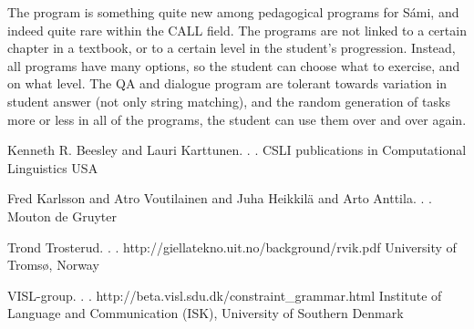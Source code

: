 \documentclass[11pt]{article}
\begin{document}
The program is something quite new among pedagogical programs for Sámi, and indeed quite rare within the CALL field. The programs are not linked to a certain chapter in a textbook, or to a certain level in the student's progression. Instead, all programs have many options, so the student can choose what to exercise, and on what level. The QA and dialogue program are tolerant towards variation in student answer (not only string matching), and the random generation of tasks more or less in all of the programs, the student can use them over and over again. 



\begin{thebibliography}{}

{Kenneth R. Beesley and Lauri Karttunen}.
.
.
\newblock CSLI publications in Computational Linguistics
\newblock USA


{Fred Karlsson and Atro Voutilainen and Juha Heikkilä and Arto Anttila}.
.
.
\newblock Mouton de Gruyter

{Trond Trosterud}.
.
.
\newblock http://giellatekno.uit.no/background/rvik.pdf
\newblock University of Tromsø, Norway

{VISL-group}.
.
.
\newblock http://beta.visl.sdu.dk/constraint\_grammar.html
\newblock Institute of Language and Communication (ISK), University of Southern Denmark


\end{thebibliography}


%
%



	
\end{document}
